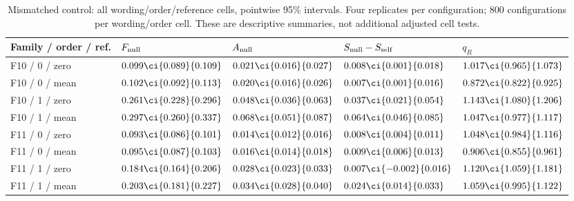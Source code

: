 \begin{table}[H]
\centering\footnotesize
\setlength{\tabcolsep}{3pt}
\caption{Mismatched control: all wording/order/reference cells, pointwise 95\% intervals. Four replicates per configuration; 800 configurations per wording/order cell. These are descriptive summaries, not additional adjusted cell tests.}
\label{tab:null-cells-mismatched}
\begin{tabularx}{\linewidth}{@{}lYYYY@{}}
\toprule
Family / order / ref. & $F_{\rm null}$ & $A_{\rm null}$ & $S_{\rm null}-S_{\rm self}$ & $q_R$ \\
\midrule
F10 / 0 / zero & $0.099\ci{0.089}{0.109}$ & $0.021\ci{0.016}{0.027}$ & $0.008\ci{0.001}{0.018}$ & $1.017\ci{0.965}{1.073}$ \\
F10 / 0 / mean & $0.102\ci{0.092}{0.113}$ & $0.020\ci{0.016}{0.026}$ & $0.007\ci{0.001}{0.016}$ & $0.872\ci{0.822}{0.925}$ \\
F10 / 1 / zero & $0.261\ci{0.228}{0.296}$ & $0.048\ci{0.036}{0.063}$ & $0.037\ci{0.021}{0.054}$ & $1.143\ci{1.080}{1.206}$ \\
F10 / 1 / mean & $0.297\ci{0.260}{0.337}$ & $0.068\ci{0.051}{0.087}$ & $0.064\ci{0.046}{0.085}$ & $1.047\ci{0.977}{1.117}$ \\
F11 / 0 / zero & $0.093\ci{0.086}{0.101}$ & $0.014\ci{0.012}{0.016}$ & $0.008\ci{0.004}{0.011}$ & $1.048\ci{0.984}{1.116}$ \\
F11 / 0 / mean & $0.095\ci{0.087}{0.103}$ & $0.016\ci{0.014}{0.018}$ & $0.009\ci{0.006}{0.013}$ & $0.906\ci{0.855}{0.961}$ \\
F11 / 1 / zero & $0.184\ci{0.164}{0.206}$ & $0.028\ci{0.023}{0.033}$ & $0.007\ci{-0.002}{0.016}$ & $1.120\ci{1.059}{1.181}$ \\
F11 / 1 / mean & $0.203\ci{0.181}{0.227}$ & $0.034\ci{0.028}{0.040}$ & $0.024\ci{0.014}{0.033}$ & $1.059\ci{0.995}{1.122}$ \\
\bottomrule
\end{tabularx}
\end{table}

